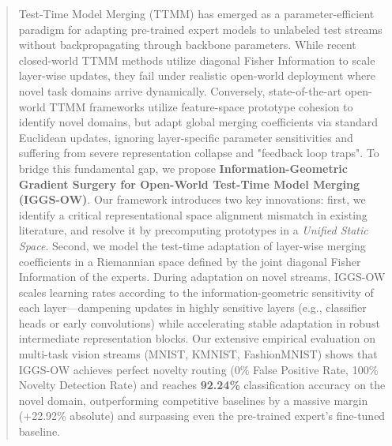 \documentclass{article}
\theoremstyle{plain}
\theoremstyle{definition}
\theoremstyle{remark}
\begin{document}

\printAffiliationsAndNotice{} %

\begin{abstract}
Test-Time Model Merging (TTMM) has emerged as a parameter-efficient paradigm for adapting pre-trained expert models to unlabeled test streams without backpropagating through backbone parameters. While recent closed-world TTMM methods utilize diagonal Fisher Information to scale layer-wise updates, they fail under realistic open-world deployment where novel task domains arrive dynamically. Conversely, state-of-the-art open-world TTMM frameworks utilize feature-space prototype cohesion to identify novel domains, but adapt global merging coefficients via standard Euclidean updates, ignoring layer-specific parameter sensitivities and suffering from severe representation collapse and "feedback loop traps". To bridge this fundamental gap, we propose \textbf{Information-Geometric Gradient Surgery for Open-World Test-Time Model Merging (IGGS-OW)}. Our framework introduces two key innovations: first, we identify a critical representational space alignment mismatch in existing literature, and resolve it by precomputing prototypes in a \textit{Unified Static Space}. Second, we model the test-time adaptation of layer-wise merging coefficients in a Riemannian space defined by the joint diagonal Fisher Information of the experts. During adaptation on novel streams, IGGS-OW scales learning rates according to the information-geometric sensitivity of each layer—dampening updates in highly sensitive layers (e.g., classifier heads or early convolutions) while accelerating stable adaptation in robust intermediate representation blocks. Our extensive empirical evaluation on multi-task vision streams (MNIST, KMNIST, FashionMNIST) shows that IGGS-OW achieves perfect novelty routing (0\% False Positive Rate, 100\% Novelty Detection Rate) and reaches \textbf{92.24\%} classification accuracy on the novel domain, outperforming competitive baselines by a massive margin (+22.92\% absolute) and surpassing even the pre-trained expert's fine-tuned baseline.
\end{abstract}
\end{document}
